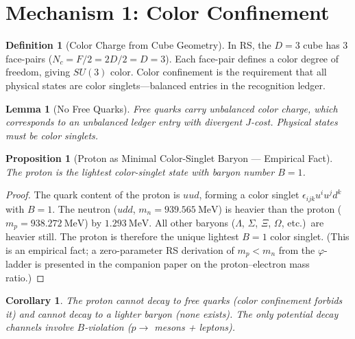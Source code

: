 \documentclass[12pt,a4paper]{article}
\newtheorem{lemma}[theorem]{Lemma}
\newtheorem{corollary}[theorem]{Corollary}
\newtheorem{proposition}[theorem]{Proposition}
\theoremstyle{definition}
\newtheorem{definition}[theorem]{Definition}
\theoremstyle{remark}
\begin{document}
\section{Mechanism 1: Color Confinement}
\label{sec:confinement}

\begin{definition}[Color Charge from Cube Geometry]
\label{def:color}
In RS, the $D = 3$ cube has 3 face-pairs
($N_c = F/2 = 2D/2 = D = 3$).  Each face-pair
defines a color degree of freedom, giving $SU(3)$ color.
Color confinement is the requirement that all physical
states are color singlets---balanced entries in the
recognition ledger.
\end{definition}

\begin{lemma}[No Free Quarks]
\label{lem:no-quarks}
Free quarks carry unbalanced color charge, which
corresponds to an unbalanced ledger entry with divergent
$J$-cost.  Physical states must be color singlets.
\end{lemma}

\begin{proposition}[Proton as Minimal Color-Singlet Baryon --- Empirical Fact]
\label{thm:minimal}
The proton is the lightest color-singlet state with
baryon number $B = 1$.
\end{proposition}

\begin{proof}
The quark content of the proton is $uud$, forming a color
singlet $\epsilon_{ijk} u^i u^j d^k$ with $B = 1$.  The
neutron ($udd$, $m_n = 939.565~\mathrm{MeV}$) is heavier
than the proton ($m_p = 938.272~\mathrm{MeV}$) by
$1.293~\mathrm{MeV}$.  All other baryons ($\Lambda$,
$\Sigma$, $\Xi$, $\Omega$, etc.)\ are heavier still.
The proton is therefore the unique lightest $B = 1$ color
singlet.  (This is an empirical fact; a zero-parameter RS
derivation of $m_p < m_n$ from the $\varphi$-ladder is
presented in the companion paper on the proton--electron
mass ratio.)
\end{proof}

\begin{corollary}
The proton cannot decay to free quarks (color confinement
forbids it) and cannot decay to a lighter baryon (none
exists).  The only potential decay channels involve
$B$-violation ($p \to$ mesons + leptons).
\end{corollary}
\end{document}
